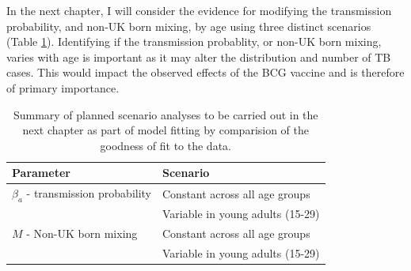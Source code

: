 \documentclass[11pt,twoside]{bristolthesis}
\begin{document}
  In the next chapter, I will consider the evidence for modifying the transmission probability, and non-UK born mixing, by age using three distinct scenarios (Table \ref{tab:summary-scenarios}). Identifying if the transmission probablity, or non-UK born mixing, varies with age is important as it may alter the distribution and number of TB cases. This would impact the observed effects of the BCG vaccine and is therefore of primary importance.
  \begin{table}[t]
  
  \caption{\label{tab:summary-scenarios}Summary of planned scenario analyses to be carried out in the next chapter as part of model fitting by comparision of the goodness of fit to the data.}
  \centering
  \begin{tabular}{>{\raggedright\arraybackslash}p{4cm}>{\raggedright\arraybackslash}p{8cm}}
  \toprule
  Parameter & Scenario\\
  \midrule
  $\beta_a$ - transmission probability & Constant across all age groups\\
   & Variable in young adults (15-29)\\
  $M$ - Non-UK born mixing & Constant across all age groups\\
   & Variable in young adults (15-29)\\
  \bottomrule
  \end{tabular}
  \end{table}
\end{document}
